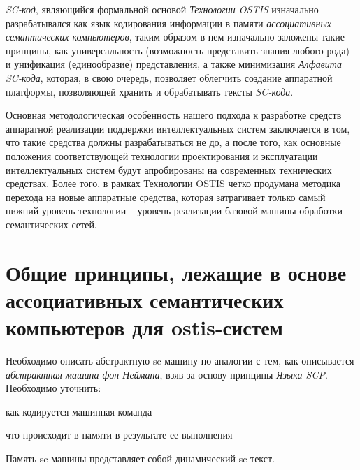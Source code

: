 \textit{SC-код}, являющийся формальной основой \textit{Технологии OSTIS} изначально разрабатывался как язык кодирования информации в памяти \textit{ассоциативных семантических компьютеров}, таким образом в нем изначально заложены такие принципы, как универсальность (возможность представить знания любого рода) и унификация (единообразие) представления, а также минимизация \textit{Алфавита SC-кода}, которая, в свою очередь, позволяет облегчить создание аппаратной платформы, позволяющей хранить и обрабатывать тексты \textit{SC-кода}.

Основная методологическая особенность нашего подхода к разработке средств аппаратной реализации поддержки интеллектуальных систем заключается в том, что такие средства должны разрабатываться не до, а \underline{после того, как} основные положения соответствующей \underline{технологии} проектирования и эксплуатации интеллектуальных систем будут апробированы на современных технических средствах. Более того, в рамках Технологии OSTIS четко продумана методика перехода на новые аппаратные средства, которая затрагивает только самый нижний уровень технологии -- уровень реализации базовой машины обработки семантических сетей.

\section{Общие принципы, лежащие в основе ассоциативных семантических компьютеров для ostis-систем}

Необходимо описать абстрактную sc-машину по аналогии с тем, как описывается \textit{абстрактная машина фон Неймана}, взяв за основу принципы \textit{Языка SCP}. Необходимо уточнить:
\begin{textitemize}
	\item как кодируется машинная команда
	\item что происходит в памяти в результате ее выполнения
\end{textitemize}

Память sc-машины представляет собой динамический sc-текст. %

